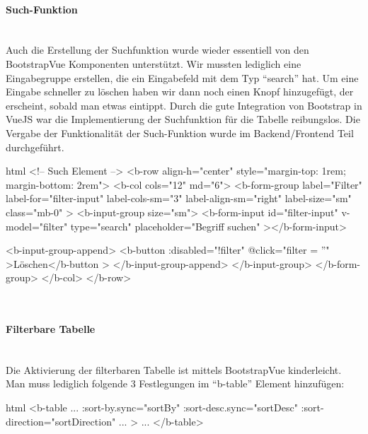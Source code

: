 \paragraph{Such-Funktion}
~\\
Auch die Erstellung der Suchfunktion wurde wieder essentiell von den BootstrapVue Komponenten unterstützt. Wir mussten lediglich eine Eingabegruppe erstellen, die ein Eingabefeld mit dem Typ \enquote{search} hat. Um eine Eingabe schneller zu löschen haben wir dann noch einen Knopf hinzugefügt, der erscheint, sobald man etwas eintippt. Durch die gute Integration von Bootstrap in VueJS war die Implementierung der Suchfunktion für die Tabelle reibungslos. Die Vergabe der Funktionalität der Such-Funktion wurde im Backend/Frontend Teil durchgeführt.
\begin{code}{html}
	<!-- Such Element -->
    <b-row align-h="center" style="margin-top: 1rem; margin-bottom: 2rem">
      <b-col cols="12" md="6">
        <b-form-group
          label="Filter"
          label-for="filter-input"
          label-cols-sm="3"
          label-align-sm="right"
          label-size="sm"
          class="mb-0"
        >
          <b-input-group size="sm">
            <b-form-input
              id="filter-input"
              v-model="filter"
              type="search"
              placeholder="Begriff suchen"
            ></b-form-input>

            <b-input-group-append>
              <b-button :disabled="!filter" @click="filter = ''"
                >Löschen</b-button
              >
            </b-input-group-append>
          </b-input-group>
        </b-form-group>
      </b-col>
    </b-row>
\end{code}
	\label{list:antragsearchcode} ~\\
\paragraph{Filterbare Tabelle}
~\\
Die Aktivierung der filterbaren Tabelle ist mittels BootstrapVue kinderleicht. Man muss lediglich folgende 3 Festlegungen im \enquote{b-table} Element hinzufügen:
\begin{code}{html}
	<b-table
		...
		:sort-by.sync="sortBy"
      	:sort-desc.sync="sortDesc"
      	:sort-direction="sortDirection"
		...
	>
	...
	</b-table>
\end{code}
	\label{list:antragfiltercode} ~\\
